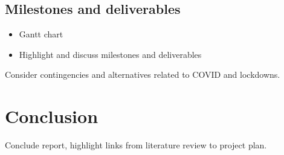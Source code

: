 \documentclass[11pt, parskip=half*,twoside=false]{scrbook}
\begin{document}
\section{Milestones and deliverables}
\begin{itemize}
	\item Gantt chart
	\item Highlight and discuss milestones and deliverables
\end{itemize}

Consider contingencies and alternatives related to COVID and lockdowns.

\chapter{Conclusion}
Conclude report, highlight links from literature review to project plan.


\end{document}

